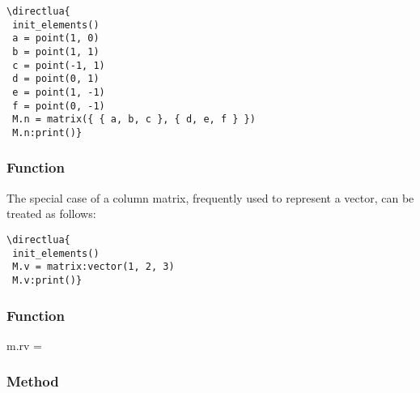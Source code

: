 \vspace{.5em}
\begin{minipage}{.5\textwidth}
\begin{verbatim}
\directlua{
 init_elements()
 a = point(1, 0)
 b = point(1, 1)
 c = point(-1, 1)
 d = point(0, 1)
 e = point(1, -1)
 f = point(0, -1)
 M.n = matrix({ { a, b, c }, { d, e, f } })
 M.n:print()}
\end{verbatim}
\end{minipage}
\begin{minipage}{.5\textwidth}
\end{minipage}

\subsubsection{Function }
\label{ssub:method_vector}

The special case of a column matrix, frequently used to represent a vector, can be treated as follows:

\vspace{.5em}
\begin{minipage}{.5\textwidth}
\begin{verbatim}
\directlua{
 init_elements()
 M.v = matrix:vector(1, 2, 3)
 M.v:print()}
  \end{verbatim}
\end{minipage}
\begin{minipage}{.5\textwidth}
\end{minipage}

\subsubsection{Function }
\label{ssub:function_row_vector}

\begin{mybox}

m.rv = 
\end{mybox}

\subsubsection{Method }
\label{ssub:function_matrix_create_n_m}

